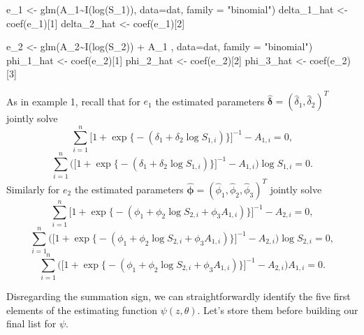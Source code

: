 \documentclass[
]{article}
\newenvironment{Shaded}{\begin{snugshade}}{\end{snugshade}}
\newcommand{\AttributeTok}[1]{\textcolor[rgb]{0.77,0.63,0.00}{#1}}
\newcommand{\DecValTok}[1]{\textcolor[rgb]{0.00,0.00,0.81}{#1}}
\newcommand{\FunctionTok}[1]{\textcolor[rgb]{0.00,0.00,0.00}{#1}}
\newcommand{\NormalTok}[1]{#1}
\newcommand{\OtherTok}[1]{\textcolor[rgb]{0.56,0.35,0.01}{#1}}
\newcommand{\SpecialCharTok}[1]{\textcolor[rgb]{0.00,0.00,0.00}{#1}}
\newcommand{\StringTok}[1]{\textcolor[rgb]{0.31,0.60,0.02}{#1}}
\begin{document}
\begin{Shaded}
\begin{Highlighting}[]
\NormalTok{e\_1 }\OtherTok{\textless{}{-}} \FunctionTok{glm}\NormalTok{(A\_1}\SpecialCharTok{\textasciitilde{}}\FunctionTok{I}\NormalTok{(}\FunctionTok{log}\NormalTok{(S\_1)), }\AttributeTok{data=}\NormalTok{dat, }\AttributeTok{family =} \StringTok{"binomial"}\NormalTok{)}
\NormalTok{delta\_1\_hat }\OtherTok{\textless{}{-}} \FunctionTok{coef}\NormalTok{(e\_1)[}\DecValTok{1}\NormalTok{]}
\NormalTok{delta\_2\_hat }\OtherTok{\textless{}{-}} \FunctionTok{coef}\NormalTok{(e\_1)[}\DecValTok{2}\NormalTok{]}

\NormalTok{e\_2 }\OtherTok{\textless{}{-}} \FunctionTok{glm}\NormalTok{(A\_2}\SpecialCharTok{\textasciitilde{}}\FunctionTok{I}\NormalTok{(}\FunctionTok{log}\NormalTok{(S\_2)) }\SpecialCharTok{+}\NormalTok{ A\_1 , }\AttributeTok{data=}\NormalTok{dat, }\AttributeTok{family =} \StringTok{"binomial"}\NormalTok{)}
\NormalTok{phi\_1\_hat }\OtherTok{\textless{}{-}} \FunctionTok{coef}\NormalTok{(e\_2)[}\DecValTok{1}\NormalTok{]}
\NormalTok{phi\_2\_hat }\OtherTok{\textless{}{-}} \FunctionTok{coef}\NormalTok{(e\_2)[}\DecValTok{2}\NormalTok{]}
\NormalTok{phi\_3\_hat }\OtherTok{\textless{}{-}} \FunctionTok{coef}\NormalTok{(e\_2)[}\DecValTok{3}\NormalTok{]}
\end{Highlighting}
\end{Shaded}

As in example 1, recall that for \(e_1\) the estimated parameters
\(\hat{\boldsymbol{\delta}}=(\hat{\delta}_1, \hat{\delta}_2)^T\) jointly
solve
\[\sum_{i=1}^{n}\Big[1+\exp\big\{-{(\delta_1+\delta_2 \log S_{1,i})\big\}\Big]^{-1}}-A_{1,i} =0,\]
\[\sum_{i=1}^{n}\bigg(\Big[1+\exp\big\{-{(\delta_1+\delta_2 \log S_{1,i})\big\}\Big]^{-1}}-A_{1,i}\bigg) \log S_{1,i}=0.\]
Similarly for \(e_2\) the estimated parameters
\(\hat{\boldsymbol{\phi}}=(\hat{\phi}_1, \hat{\phi}_2, \hat{\phi}_3)^T\)
jointly solve
\[\sum_{i=1}^{n}\Big[1+\exp\big\{-{(\phi_1+\phi_2 \log S_{2,i}+\phi_3 A_{1,i})\big\}\Big]^{-1}}-A_{2,i} =0,\]
\[\sum_{i=1}^{n}\bigg(\Big[1+\exp\big\{-{(\phi_1+\phi_2 \log S_{2,i}+\phi_3 A_{1,i})\big\}\Big]^{-1}}-A_{2,i}\bigg) \log S_{2,i}=0,\]
\[\sum_{i=1}^{n}\bigg(\Big[1+\exp\big\{-{(\phi_1+\phi_2 \log S_{2,i}+\phi_3 A_{1,i})\big\}\Big]^{-1}}-A_{2,i}\bigg) A_{1,i}=0.\]

Disregarding the summation sign, we can straightforwardly identify the
five first elements of the estimating function \(\psi(z,\theta)\). Let's
store them before building our final list for \(\psi\).
\end{document}
